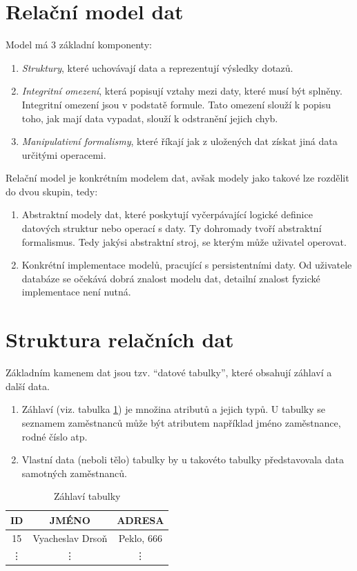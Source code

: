 \section{Relační model dat}
Model má 3 základní komponenty:
\begin{enumerate}
\item \textit{Struktury}, které uchovávají data a reprezentují výsledky dotazů.
\item \textit{Integritní omezení}, která popisují vztahy mezi daty, které musí být splněny. Integritní omezení jsou v podstatě formule. Tato omezení slouží k popisu toho, jak mají data vypadat, slouží k odstranění jejich chyb.
\item \textit{Manipulativní formalismy}, které říkají jak z uložených dat získat jiná data určitými operacemi.
\end{enumerate}
Relační model je konkrétním modelem dat, avšak modely jako takové lze rozdělit do dvou skupin, tedy:
\begin{enumerate}
\item Abstraktní modely dat, které poskytují vyčerpávající logické definice datových struktur nebo operací s daty. Ty dohromady tvoří abstraktní formalismus. Tedy jakýsi abstraktní stroj, se kterým může uživatel operovat.
\item Konkrétní implementace modelů, pracující s persistentními daty. Od uživatele databáze se očekává dobrá znalost modelu dat, detailní znalost fyzické implementace není nutná.
\end{enumerate}

\section{Struktura relačních dat}
Základním kamenem dat jsou tzv. \enquote{datové tabulky}, které obsahují záhlaví a další data.
\begin{enumerate}
\item Záhlaví (viz. tabulka \ref{tab:zahlavi}) je množina atributů a jejich typů. U tabulky se seznamem zamě\-stnanců může být atributem například jméno zaměstnance, rodné číslo atp.
\item Vlastní data (neboli tělo) tabulky by u takovéto tabulky představovala data samotných zaměstnanců.
\end{enumerate}

\begin{table}
\caption{Záhlaví tabulky}\label{tab:zahlavi}
\begin{center}
\begin{tabular}{|c|c|c|}
\hline
ID & JMÉNO & ADRESA \\
\hline
15 & Vyacheslav Drsoň & Peklo, 666 \\
\hline
\vdots & \vdots & \vdots \\
\hline
\end{tabular}
\end{center}
\end{table}

